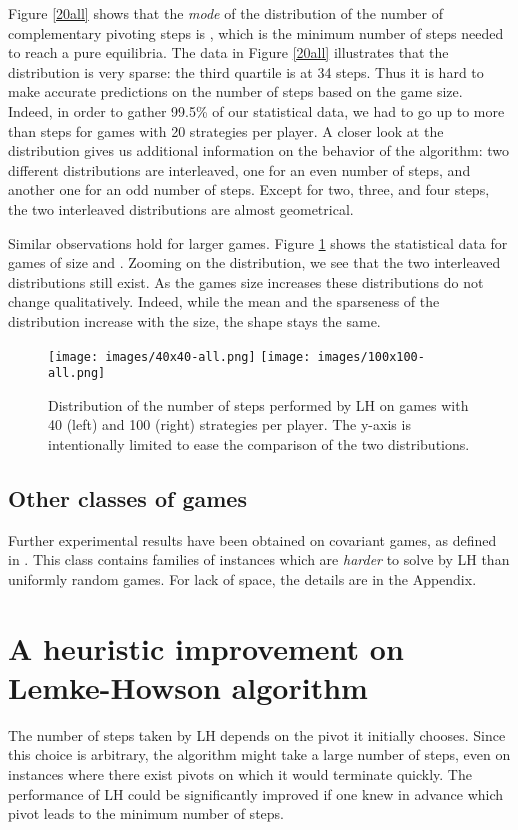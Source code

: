 \documentclass[11pt]{article}
\begin{document}
Figure \ref{20all} shows that the {\em mode} of the distribution of
the number of complementary pivoting steps is , which is the
minimum number of steps needed to reach a pure equilibria. The data
in Figure \ref{20all} illustrates that the distribution is very
sparse: the third quartile is at 34 steps. Thus it is hard to make
accurate predictions on the number of steps based on the game size.
Indeed, in order to gather 99.5\% of our statistical data, we had to
go up to more than  steps for games with 20 strategies per
player. A closer look at the distribution gives us additional
information on
the behavior of the algorithm: two different distributions are
interleaved, one for an even number of steps, and another one for an
odd number of steps. Except for two, three, and four steps, the two
interleaved distributions are almost geometrical.

Similar observations hold for larger games. Figure \ref{step_dist_2}
shows the statistical data for games of size  and . Zooming
on the distribution, we see that the two interleaved distributions
still exist. As the games size increases these distributions do not
change qualitatively. Indeed, while the mean and the sparseness of
the distribution increase with the size, the shape stays the same.
\begin{figure}[h]
\centering
\texttt{[image: images/40x40-all.png]}
\texttt{[image: images/100x100-all.png]}
\caption{Distribution of the number of steps performed by LH on
games with 40 (left) and 100 (right) strategies per player. The y-axis is
intentionally limited to ease the comparison of the two
distributions.} \label{step_dist_2}
\end{figure}

\subsection{Other classes of games}

Further experimental results have been obtained on covariant games,
as defined in \cite{covariance}. This class contains families of
instances which are \emph{harder} to solve by LH than uniformly
random games. For lack of space, the details are in the Appendix.

\section{A heuristic improvement on Lemke-Howson algorithm}

The number of steps taken by LH depends on the pivot it initially
chooses. Since this choice is arbitrary, the algorithm might take a
large number of steps, even on instances where there exist pivots on
which it would terminate quickly. The performance of LH could be
significantly improved if one knew in advance which pivot
leads to the minimum number of steps.
\end{document}
